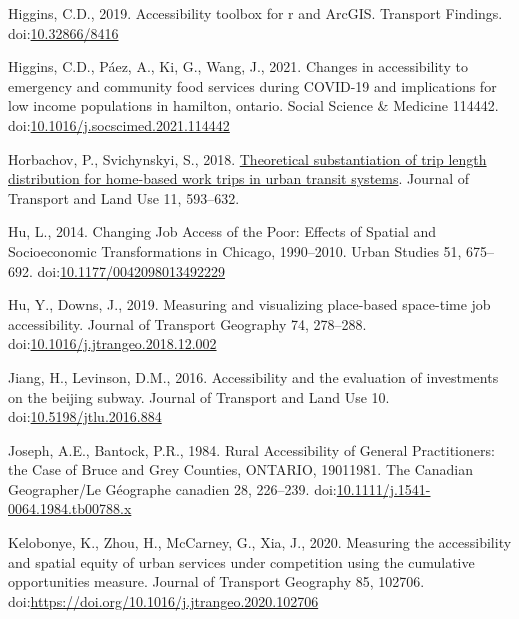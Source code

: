 \documentclass[]{elsarticle} %
\newlength{\cslhangindent}
\newlength{\cslentryspacingunit} %
\newenvironment{CSLReferences}[2] %
 {%
  \setlength{\parindent}{0pt}
  \ifodd #1
  \let\oldpar\par
  \def\par{\hangindent=\cslhangindent\oldpar}
  \fi
  \setlength{\parskip}{#2\cslentryspacingunit}
 }%
 {}
\begin{document}
\begin{CSLReferences}{1}{0}
\leavevmode{}%
Higgins, C.D., 2019. Accessibility toolbox for r and ArcGIS. Transport
Findings. doi:\href{https://doi.org/10.32866/8416}{10.32866/8416}

\leavevmode{}%
Higgins, C.D., Páez, A., Ki, G., Wang, J., 2021. Changes in
accessibility to emergency and community food services during COVID-19
and implications for low income populations in hamilton, ontario. Social
Science \& Medicine 114442.
doi:\href{https://doi.org/10.1016/j.socscimed.2021.114442}{10.1016/j.socscimed.2021.114442}

\leavevmode{}%
Horbachov, P., Svichynskyi, S., 2018.
\href{https://www.jstor.org/stable/26622420}{Theoretical substantiation
of trip length distribution for home-based work trips in urban transit
systems}. Journal of Transport and Land Use 11, 593--632.

\leavevmode{}%
Hu, L., 2014. Changing {Job} {Access} of the {Poor}: {Effects} of
{Spatial} and {Socioeconomic} {Transformations} in {Chicago},
1990--2010. Urban Studies 51, 675--692.
doi:\href{https://doi.org/10.1177/0042098013492229}{10.1177/0042098013492229}

\leavevmode{}%
Hu, Y., Downs, J., 2019. Measuring and visualizing place-based
space-time job accessibility. Journal of Transport Geography 74,
278--288.
doi:\href{https://doi.org/10.1016/j.jtrangeo.2018.12.002}{10.1016/j.jtrangeo.2018.12.002}

\leavevmode{}%
Jiang, H., Levinson, D.M., 2016. Accessibility and the evaluation of
investments on the beijing subway. Journal of Transport and Land Use 10.
doi:\href{https://doi.org/10.5198/jtlu.2016.884}{10.5198/jtlu.2016.884}

\leavevmode{}%
Joseph, A.E., Bantock, P.R., 1984. Rural Accessibility of General
Practitioners: the Case of Bruce and Grey Counties, ONTARIO,
1901{\textendash}1981. The Canadian Geographer/Le Géographe canadien 28,
226--239.
doi:\href{https://doi.org/10.1111/j.1541-0064.1984.tb00788.x}{10.1111/j.1541-0064.1984.tb00788.x}

\leavevmode{}%
Kelobonye, K., Zhou, H., McCarney, G., Xia, J., 2020. Measuring the
accessibility and spatial equity of urban services under competition
using the cumulative opportunities measure. Journal of Transport
Geography 85, 102706.
doi:\url{https://doi.org/10.1016/j.jtrangeo.2020.102706}


\end{CSLReferences}
\end{document}
